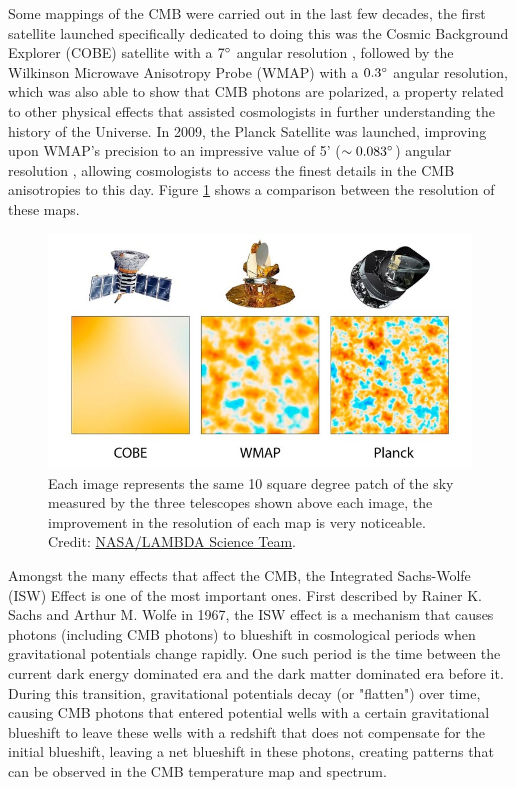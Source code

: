 \documentclass[openany,a4paper,12pt,oneside]{book}
\begin{document}
\begin{spacing}{1.5}
Some mappings of the CMB were carried out in the last few decades, the first satellite launched specifically dedicated to doing this was the Cosmic Background Explorer (COBE) satellite with a $7\degree$ angular resolution \cite{COBE}, followed by the Wilkinson Microwave Anisotropy Probe (WMAP) with a $0.3\degree$ angular resolution, which was also able to show that CMB photons are polarized, a property related to other physical effects that assisted cosmologists in further understanding the history of the Universe\cite{polarization_1997, polarization_2014, BMode_constraints}. In 2009, the Planck Satellite was launched, improving upon WMAP's precision to an impressive value of 5' ($\sim 0.083\degree$) angular resolution \cite{theplanckcollaboration2006scientific}, allowing cosmologists to access the finest details in the CMB anisotropies to this day. Figure \ref{fig:cmb_satellites} shows a comparison between the resolution of these maps.

\begin{figure}
    \centering
    \includegraphics[width=.7\linewidth]{Imagens/satellites.jpg}
    \caption{Each image represents the same 10 square degree patch of the sky measured by the three telescopes shown above each image, the improvement in the resolution of each map is very noticeable. Credit: \href{https://lambda.gsfc.nasa.gov/education/graphic_history/microwaves.html}{NASA/LAMBDA Science Team}.}
    \label{fig:cmb_satellites}
\end{figure}

Amongst the many effects that affect the CMB, the Integrated Sachs-Wolfe (ISW) Effect is one of the most important ones. First described by Rainer K. Sachs and Arthur M. Wolfe in 1967, the ISW effect is a mechanism that causes photons (including CMB photons) to blueshift in cosmological periods when gravitational potentials change rapidly. One such period is the time between the current dark energy dominated era and the dark matter dominated era before it. During this transition, gravitational potentials decay (or "flatten") over time, causing CMB photons that entered potential wells with a certain gravitational blueshift to leave these wells with a redshift that does not compensate for the initial blueshift, leaving a net blueshift in these photons, creating patterns that can be observed in the CMB temperature map and spectrum\cite{Sachs:1967er}.


\end{spacing}
\end{document}
